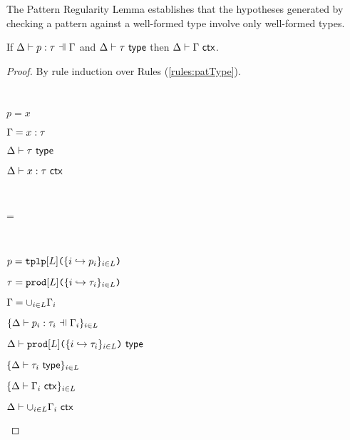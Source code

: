 \begin{grayparbox}
The Pattern Regularity Lemma establishes that the hypotheses generated by checking a pattern against a well-formed type involve only well-formed types.
\begin{lemma}\label{lemma:pattern-regularity-UP} 
If $\patType{\pctx}{p}{\tau}$ and $\Delta \vdash \tau~\mathsf{type}$ then $\Delta \vdash \Gamma~\mathsf{ctx}$.
\end{lemma}
\begin{proof} By rule induction over Rules (\ref{rules:patType}).
\begin{byCases}
\item[\text{(\ref{rule:patType-var})}] ~
\begin{pfsteps*}
  \item $p=x$ 
  \item $\Gamma=x : \tau$ 
  \item $\Delta \vdash \tau~\mathsf{type}$ 
  \item $\Delta \vdash x : \tau~\mathsf{ctx}$ 
 \end{pfsteps*}
 \resetpfcounter
\item[\text{(\ref{rule:patType-wild})}] ~
\begin{pfsteps}
\item \pctx=\emptyset {}
\item \isctxU{\Delta}{\emptyset} 
\end{pfsteps}
\resetpfcounter

\item[\text{(\ref{rule:patType-tpl})}] ~
\begin{pfsteps*}
  \item $p=\texttt{tplp}[L]\texttt{(}\{i \hookrightarrow p_{i}\}_{i \in L}\texttt{)}$ 
  \item $\tau=\texttt{prod}[L]\texttt{(}\{i \hookrightarrow \tau_{i}\}_{i \in L}\texttt{)}$ 
  \item $\Gamma=\cup_{i \in L} \Gamma_i$ 
  \item $\{\patType{\pctx_i}{p_i}{\tau_i}\}_{i \in \labelset}$ 
  \item $\Delta \vdash \texttt{prod}[L]\texttt{(}\{i \hookrightarrow \tau_{i}\}_{i \in L}\texttt{)}~\mathsf{type}$  
  \item $\{\Delta \vdash \tau_i~\mathsf{type}\}_{i \in L}$ 
  \item $\{\Delta \vdash \Gamma_i~\mathsf{ctx}\}_{i \in L}$  
  \item $\Delta \vdash \cup_{i \in L} \Gamma_i~\mathsf{ctx}$ 
\end{pfsteps*}
\resetpfcounter


\end{byCases}
\end{proof}
\end{grayparbox}
